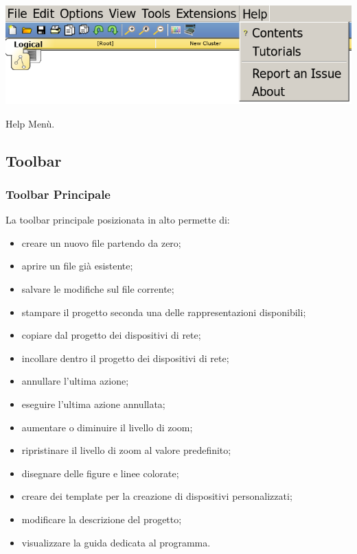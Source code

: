 \begin{sfigure}
    \centering
    \captionsetup{type=figure}
    \includegraphics[scale=.3]{images/02.packet-tracer/help.png}
    \caption{Help Menù.}
\end{sfigure}

\subsection{Toolbar}

\subsubsection{Toolbar Principale}
La toolbar principale posizionata in alto permette di:

\begin{itemize}
    \item creare un nuovo file partendo da zero;
    \item aprire un file già esistente;
    \item salvare le modifiche sul file corrente;
    \item stampare il progetto seconda una delle rappresentazioni disponibili;
    \item copiare dal progetto dei dispositivi di rete;
    \item incollare dentro il progetto dei dispositivi di rete;
    \item annullare l'ultima azione;
    \item eseguire l'ultima azione annullata;
    \item aumentare o diminuire il livello di zoom;
    \item ripristinare il livello di zoom al valore predefinito;
    \item disegnare delle figure e linee colorate;
    \item creare dei template per la creazione di dispositivi personalizzati;
    \item modificare la descrizione del progetto;
    \item visualizzare la guida dedicata al programma.
\end{itemize}

